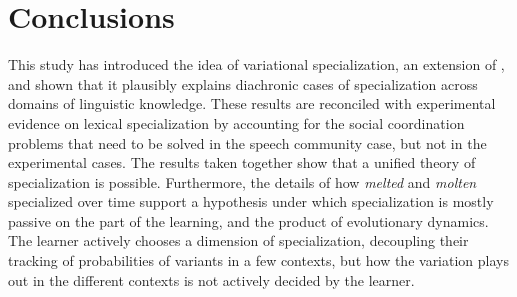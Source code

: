 \documentclass{artikel3}
\begin{document}









\section{Conclusions}

This study has introduced the idea of variational specialization, an extension of \citet{yang2000, yang2002}, and shown that it plausibly explains diachronic cases of specialization across domains of linguistic knowledge. These results are reconciled with experimental evidence on lexical specialization by accounting for the social coordination problems that need to be solved in the speech community case, but not in the experimental cases. The results taken together show that a unified theory of specialization is possible. Furthermore, the details of how \textsl{melted} and \textsl{molten} specialized over time support a hypothesis under which specialization is mostly passive on the part of the learning, and the product of evolutionary dynamics. The learner actively chooses a dimension of specialization, decoupling their tracking of probabilities of variants in a few contexts, but how the variation plays out in the different contexts is not actively decided by the learner.
\end{document}
